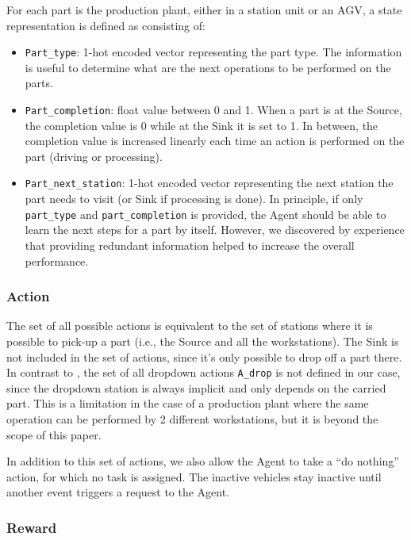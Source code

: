 \documentclass[sn-mathphys]{sn-jnl}
\begin{document}
For each part is the production plant, either in a station unit or an AGV, a state representation is defined as consisting of:
\begin{itemize}
    \item \texttt{Part\_type}: 1-hot encoded vector representing the part type. The information is useful to determine what are the next operations to be performed on the parts.
    \item \texttt{Part\_completion}: float value between 0 and 1. When a part is at the Source, the completion value is 0 while at the Sink it is set to 1. In between, the completion value is increased linearly each time an action is performed on the part (driving or processing).
    \item \texttt{Part\_next\_station}: 1-hot encoded vector representing the next station the part needs to visit (or Sink if processing is done). In principle, %
    if only \texttt{part\_type} and \texttt{part\_completion} is provided, the Agent should be able to learn the next steps for a part by itself. However, we discovered by experience that providing redundant information helped to increase the overall performance.
\end{itemize}

\subsubsection{Action}

The set of all possible actions is equivalent to the set of stations where it is possible to pick-up a part (i.e., the Source and all the workstations). The Sink is not included in the set of actions, since it’s only possible to drop off a part there. In contrast to \cite{Mayer2021}, the set of all dropdown actions \texttt{A\_drop} is not defined in our case, since the dropdown station is always implicit and only depends on the carried part. This is a limitation in the case of a production plant where the same operation can be performed by 2 different workstations, but it is beyond the scope of this paper.

In addition to this set of actions, we also allow the Agent to take a “do no\-thing” action, for which no task is assigned. The inactive vehicles stay inactive until another event triggers a request to the Agent.

\subsubsection{Reward}
\end{document}
